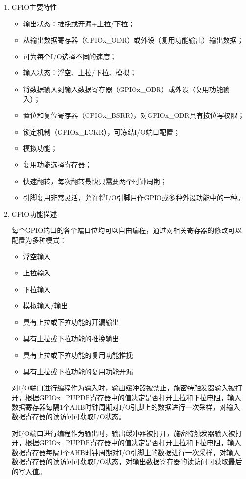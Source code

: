 ﻿\documentclass[UTF8,12pt]{article}
\begin{document}
\begin{enumerate}
    \item GPIO主要特性
    \begin{itemize}
        \item 输出状态：推挽或开漏+上拉/下拉；
        \item 从输出数据寄存器（GPIOx\_ODR）或外设（复用功能输出）输出数据；
        \item 可为每个I/O选择不同的速度；
        \item 输入状态：浮空、上拉/下拉、模拟；
        \item 将数据输入到输入数据寄存器（GPIOx\_ODR）或外设（复用功能输入）；
        \item 置位和复位寄存器（GPIOx\_BSRR），对GPIOx\_ODR具有按位写权限；
        \item 锁定机制（GPIOx\_LCKR），可冻结I/O端口配置；
        \item 模拟功能；
        \item 复用功能选择寄存器；
        \item 快速翻转，每次翻转最快只需要两个时钟周期；
        \item 引脚复用非常灵活，允许将I/O引脚用作GPIO或多种外设功能中的一种。
    \end{itemize}
    \item GPIO功能描述

    每个GPIO端口的各个端口位均可以自由编程，通过对相关寄存器的修改可以配置为多种模式：
    \begin{itemize}
        \item 浮空输入
        \item 上拉输入
        \item 下拉输入
        \item 模拟输入/输出
        \item 具有上拉或下拉功能的开漏输出
        \item 具有上拉或下拉功能的推挽输出
        \item 具有上拉或下拉功能的复用功能推挽
        \item 具有上拉或下拉功能的复用功能开漏
    \end{itemize}
    对I/O端口进行编程作为输入时，输出缓冲器被禁止，施密特触发器输入被打开，根据GPIOx\_PUPDR寄存器中的值决定是否打开上拉和下拉电阻，输入数据寄存器每隔1个AHB时钟周期对I/O引脚上的数据进行一次采样，对输入数据寄存器的读访问可获取I/O状态。

    对I/O端口进行编程作为输出时，输出缓冲器被打开，施密特触发器输入被打开，根据GPIOx\_PUPDR寄存器中的值决定是否打开上拉和下拉电阻，输入数据寄存器每隔1个AHB时钟周期对I/O引脚上的数据进行一次采样，对输入数据寄存器的读访问可获取I/O状态，对输出数据寄存器的读访问可获取最后的写入值。


\end{enumerate}
\end{document}
